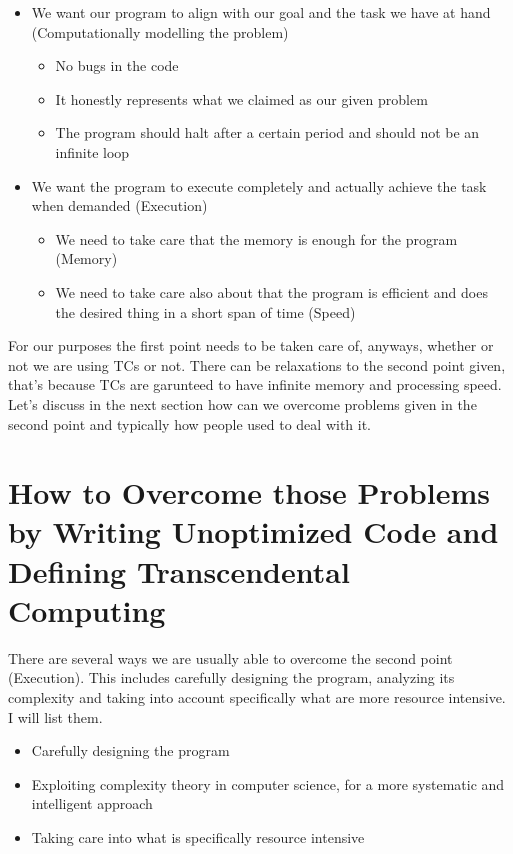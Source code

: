 \documentclass{book}
\begin{document}
\begin{itemize}
    \item We want our program to align with our goal and the task we have at hand (Computationally modelling the problem)
    \begin{itemize}
        \item No bugs in the code
        \item It honestly represents what we claimed as our given problem
        \item The program should halt after a certain period and should not be an infinite loop
    \end{itemize}
    
    \item We want the program to execute completely and actually achieve the task when demanded (Execution)
    \begin{itemize}
        \item We need to take care that the memory is enough for the program (Memory)
        \item We need to take care also about that the program is efficient and does the desired thing in a short span of time (Speed)
    \end{itemize}
\end{itemize}

For our purposes the first point needs to be taken care of, anyways, whether or not we are using TCs or not. There can be relaxations to the second point given, that's because TCs are garunteed to have infinite memory and processing speed. Let's discuss in the next section how can we overcome problems given in the second point and typically how people used to deal with it.

\section{How to Overcome those Problems by Writing Unoptimized Code and Defining Transcendental Computing}

There are several ways we are usually able to overcome the second point (Execution). This includes carefully designing the program, analyzing its complexity and taking into account specifically what are more resource intensive. I will list them.

\begin{itemize}
    \item Carefully designing the program
    \item Exploiting complexity theory in computer science, for a more systematic and intelligent approach 
    \item Taking care into what is specifically resource intensive
\end{itemize}
\end{document}
